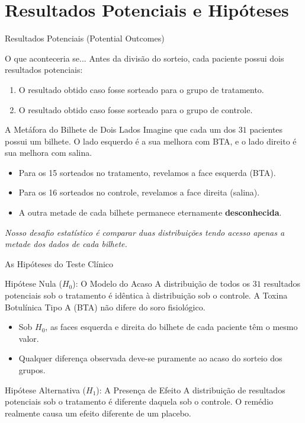 \section{Resultados Potenciais e Hipóteses}

\begin{frame}{Resultados Potenciais (Potential Outcomes)}
    \begin{block}{O que aconteceria se...}
        Antes da divisão do sorteio, cada paciente possui dois resultados potenciais:
        \begin{enumerate}
            \item O resultado obtido caso fosse sorteado para o grupo de tratamento.
            \item O resultado obtido caso fosse sorteado para o grupo de controle.
        \end{enumerate}
    \end{block}
    \begin{block}{A Metáfora do Bilhete de Dois Lados}
        Imagine que cada um dos $31$ pacientes possui um bilhete. O lado esquerdo é a sua melhora com BTA, e o lado direito é sua melhora com salina.
        \begin{itemize}
            \item Para os 15 sorteados no tratamento, revelamos a face esquerda (BTA).
            \item Para os 16 sorteados no controle, revelamos a face direita (salina).
            \item A outra metade de cada bilhete permanece eternamente \textbf{desconhecida}.
        \end{itemize}
    \end{block}
    \centering
    \textit{Nosso desafio estatístico é comparar duas distribuições tendo acesso apenas a metade dos dados de cada bilhete.}
\end{frame}

\begin{frame}{As Hipóteses do Teste Clínico}
    \begin{block}{Hipótese Nula ($H_0$): O Modelo do Acaso}
        A distribuição de todos os $31$ resultados potenciais sob o tratamento é idêntica à distribuição sob o controle. A Toxina Botulínica Tipo A (BTA) não difere do soro fisiológico.
        \begin{itemize}
            \item Sob $H_0$, as faces esquerda e direita do bilhete de cada paciente têm o mesmo valor.
            \item Qualquer diferença observada deve-se puramente ao acaso do sorteio dos grupos.
        \end{itemize}
    \end{block}
    \begin{block}{Hipótese Alternativa ($H_1$): A Presença de Efeito}
        A distribuição de resultados potenciais sob o tratamento é diferente daquela sob o controle. O remédio realmente causa um efeito diferente de um placebo.
    \end{block}
\end{frame}
